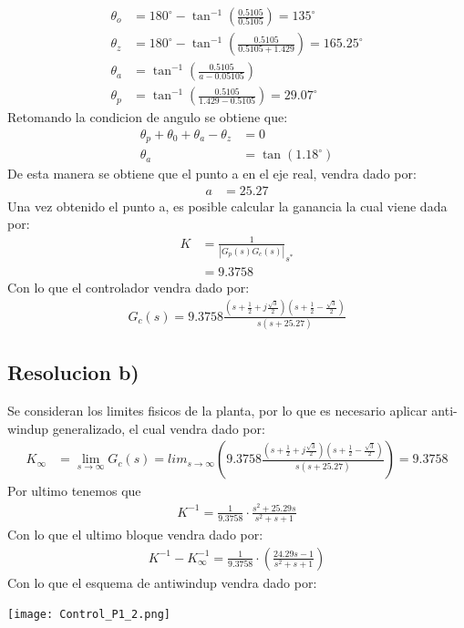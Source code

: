\documentclass[
  11pt,
  letterpaper,
   addpoints,
   answers
  ]{exam}
\begin{document}
\begin{questions}
\begin{solution}
\begin{align}
        \theta_o &= 180^{\circ} - \tan^{-1}\left(\frac{0.5105}{0.5105}\right) = 135^{\circ} \\
        \theta_z &= 180^{\circ} - \tan^{-1}\left(\frac{0.5105}{0.5105 + 1.429}\right) = 165.25^{\circ} \\
        \theta_a &= \tan^{-1}\left( \frac{0.5105}{a - 0.05105}\right) \\
        \theta_p &= \tan^{-1}\left( \frac{0.5105}{1.429 - 0.5105}\right) = 29.07^{\circ}
    \end{align}
    Retomando la condicion de angulo se obtiene que:
    \begin{align}
        \theta_p + \theta_0 + \theta_a - \theta_z &= 0\\
        \theta_{a}&=\tan(1.18^{\circ})
    \end{align}
    De esta manera se obtiene que el punto a en el eje real, vendra dado por:
    \begin{align}
        a &=25.27
    \end{align}
    Una vez obtenido el punto a, es posible calcular la ganancia la cual viene dada por:
    \begin{align}
        K &= \frac{1}{|G_{p}(s)G_{c}(s)|}_{s^{*}}\\
        &=9.3758
    \end{align}
    Con lo que el controlador vendra dado por:
    \begin{align}
        G_{c}(s) = 9.3758 \frac{\left(s + \frac{1}{2} + j\frac{\sqrt{3}}{2}\right)\left(s+ \frac{1}{2} - \frac{\sqrt{3}}{2}\right)}{s(s+25.27)}
    \end{align}
    \subsection*{Resolucion b)}
    Se consideran los limites fisicos de la planta, por lo que es necesario aplicar anti-windup generalizado, el cual vendra dado por:
    \begin{align}
        K_{\infty} &= \lim_{s \to \infty} 
            G_{c}(s) = lim_{s \to \infty} \left(9.3758 \frac{\left(s + \frac{1}{2} + j\frac{\sqrt{3}}{2}\right)\left(s+ \frac{1}{2} - \frac{\sqrt{3}}{2}\right)}{s(s+25.27)}\right)
        = 9.3758
    \end{align}
Por ultimo tenemos que
\begin{align}
    K^{-1} = \frac{1}{9.3758} \cdot \frac{s^{2} + 25.29s}{s^{2}+s +1}
\end{align}
Con lo que el ultimo bloque vendra dado por:
\begin{align}
    K^{-1} - K_{\infty}^{-1} = \frac{1}{9.3758} \cdot \left(\frac{24.29s-1}{s^{2}+s+1}\right)
\end{align}
Con lo que el esquema de antiwindup vendra dado por:
\begin{center}
    \texttt{[image: Control\_P1\_2.png]}
  \end{center}

\end{solution}
\end{questions}
\end{document}
